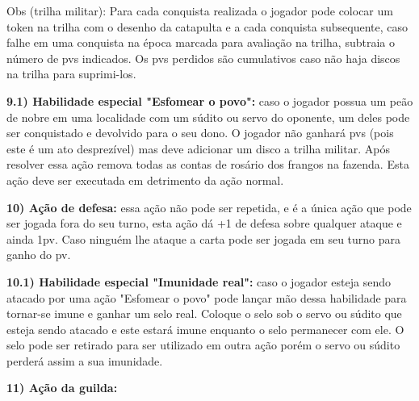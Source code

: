 \documentclass[11pt]{article}
\begin{document}
Obs (trilha militar): Para cada conquista realizada o jogador pode colocar um token na trilha com o desenho da catapulta e a cada conquista subsequente, caso falhe em uma conquista na época marcada para avaliação na trilha,
 subtraia o número de pvs indicados. Os pvs perdidos são cumulativos caso não haja discos na trilha para suprimi-los.

\textbf{9.1) Habilidade especial "Esfomear o povo":} caso o jogador possua um peão de nobre em uma localidade com um súdito ou servo do oponente, um deles pode ser conquistado e devolvido para o seu dono. O jogador não ganhará pvs
(pois este é um ato desprezível) mas deve adicionar um disco a trilha militar. Após resolver essa ação remova todas as contas de rosário dos frangos na fazenda. Esta ação deve ser executada em detrimento da ação normal.

\textbf{10) Ação de defesa:} essa ação não pode ser repetida, e é a única ação que pode ser jogada fora do seu turno, esta ação dá +1 de defesa sobre qualquer ataque e ainda 1pv. Caso ninguém lhe ataque a carta pode ser jogada em seu
turno para ganho do pv.

\textbf{10.1) Habilidade especial "Imunidade real":} caso o jogador esteja sendo atacado por uma ação "Esfomear o povo" pode lançar mão dessa habilidade para tornar-se imune e ganhar um selo real. Coloque o selo sob o servo ou súdito
que esteja sendo atacado e este estará imune enquanto o selo permanecer com ele. O selo pode ser retirado para ser utilizado em outra ação porém o servo ou súdito perderá assim a sua imunidade.

\textbf{11) Ação da guilda:}
\end{document}
